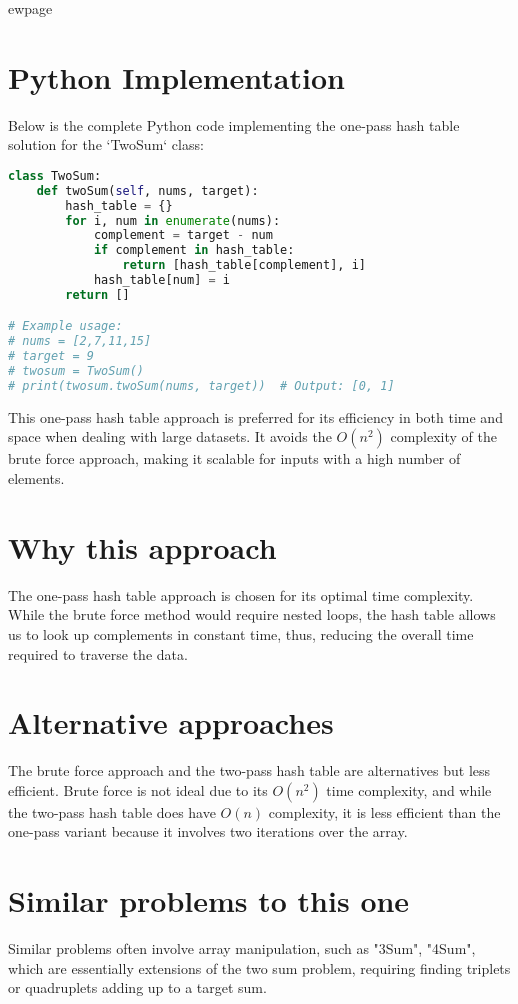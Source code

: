 ewpage
\section*{Python Implementation}
Below is the complete Python code implementing the one-pass hash table solution for the `TwoSum` class:

\begin{fullwidth}
\begin{lstlisting}[language=Python]
class TwoSum:
    def twoSum(self, nums, target):
        hash_table = {}
        for i, num in enumerate(nums):
            complement = target - num
            if complement in hash_table:
                return [hash_table[complement], i]
            hash_table[num] = i
        return []

# Example usage:
# nums = [2,7,11,15]
# target = 9
# twosum = TwoSum()
# print(twosum.twoSum(nums, target))  # Output: [0, 1]
\end{lstlisting}

\end{fullwidth}

This one-pass hash table approach is preferred for its efficiency in both time and space when dealing with large datasets. It avoids the \(O(n^2)\) complexity of the brute force approach, making it scalable for inputs with a high number of elements.

\section*{Why this approach}
The one-pass hash table approach is chosen for its optimal time complexity. While the brute force method would require nested loops, the hash table allows us to look up complements in constant time, thus, reducing the overall time required to traverse the data.

\section*{Alternative approaches}
The brute force approach and the two-pass hash table are alternatives but less efficient. Brute force is not ideal due to its \(O(n^2)\) time complexity, and while the two-pass hash table does have \(O(n)\) complexity, it is less efficient than the one-pass variant because it involves two iterations over the array.

\section*{Similar problems to this one}
Similar problems often involve array manipulation, such as "3Sum", "4Sum", which are essentially extensions of the two sum problem, requiring finding triplets or quadruplets adding up to a target sum.


